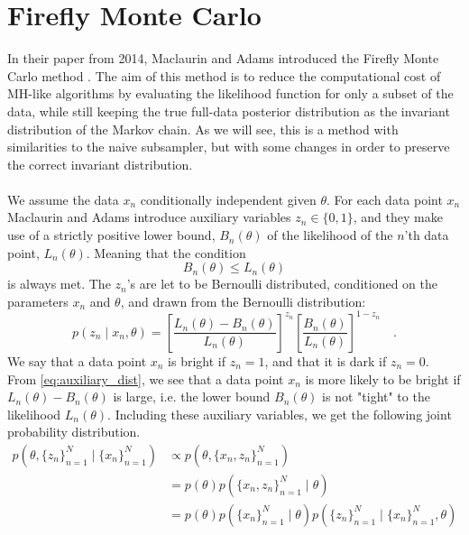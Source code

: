  \section{Firefly Monte Carlo}\label{sec:Firefly}
In their paper from 2014, Maclaurin and Adams  introduced the Firefly Monte Carlo method \cite{Maclaurin:1}. 
The aim of this method is to reduce the computational cost of MH-like algorithms by evaluating the likelihood function for only a subset of the data, while still keeping the true full-data posterior distribution as the invariant distribution of the Markov chain. As we will see, this is a method with similarities to the naive subsampler, but with some changes in order to preserve the correct invariant distribution.  \\ \\
We assume the data $x_n$ conditionally independent given $\theta$.
For each data point $x_n$ Maclaurin and Adams introduce auxiliary variables $z_n \in \{0, 1\}$, and they make use of a strictly positive lower bound, $B_n\left(\theta\right)$ of the likelihood of the $n$'th data point, $L_n\left(\theta\right)$.  Meaning that the condition 
\begin{equation}
    B_n\left(\theta\right) \leq L_n\left(\theta\right)
\end{equation} is always met. 
The $z_n$'s are let to be Bernoulli distributed, conditioned on the parameters $x_n$ and $\theta$, 
and drawn from the  Bernoulli distribution:
\begin{equation}\label{eq:auxiliary_dist}
    p(z_n\mid x_n,\theta) = \left[\frac{L_n(\theta) - B_n(\theta)}{L_n(\theta)}\right]^{z_n}\left[\frac{B_n(\theta)}{L_n(\theta)}\right]^{1-z_n} \quad .
\end{equation}
We say that a data point $x_n$ is bright if $z_n = 1$, and that it is dark if $z_n = 0$. 
From \eqref{eq:auxiliary_dist}, we see that a data point $x_n$ is more likely to be bright if $L_n(\theta) - B_n(\theta)$ is large, i.e. the lower bound $B_n(\theta)$ is not "tight" to the likelihood $L_n(\theta)$. Including these auxiliary variables, we get the following joint probability distribution. 
\begin{equation*}
\begin{split}
     p(\theta, \{z_n\}_{n=1}^N\mid\{x_n\}_{n=1}^N) &\propto p(\theta, \{x_n, z_n\}_{n = 1}^N) \\
     &= p(\theta) p(\{x_n, z_n\}_{n=1}^N\mid\theta) \\
     & = p(\theta)p(\{x_n\}_{n=1}^N\mid\theta)p(\{z_n\}_{n=1}^N\mid \{x_n\}_{n=1}^N, \theta)
\end{split}
\end{equation*}{}
